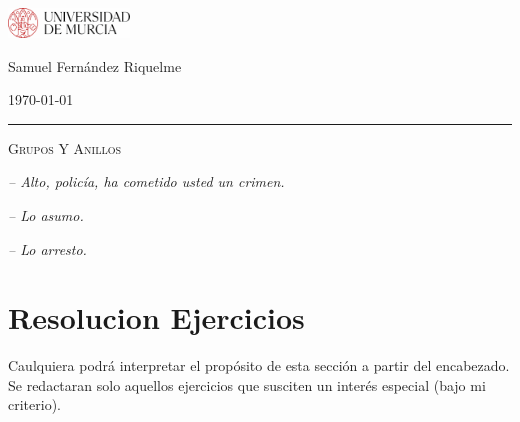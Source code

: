 \documentclass{article}
\begin{document}
\begin{titlepage}
    \begin{minipage}{0.4\textwidth}
        \includegraphics[height=30px]{murcialog.png}
    \end{minipage}\hfill
    \begin{minipage}{0.55\textwidth}
        \hfill{Samuel Fernández Riquelme}

        \hfill{\today}
    \end{minipage}

    \vspace{10px}

    \hrule

    \vspace{7px}

    \begin{center}
        {\Huge \textsc{Grupos Y Anillos}}
    \end{center}

    \vspace{10px}

    \hfill{\textit{-- Alto, policía, ha cometido usted un crimen.}}

    \hfill{\textit{-- Lo asumo.}}

    \hfill{\textit{-- Lo arresto.}}

    \tableofcontents
\end{titlepage}

\newpage

\section{Resolucion Ejercicios}

Caulquiera podrá interpretar el propósito de esta sección a partir del encabezado. Se redactaran solo aquellos ejercicios que susciten un interés especial (bajo mi criterio).
\end{document}
